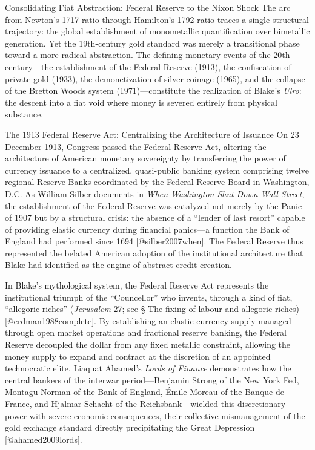 \documentclass[
  ignorenonframetext,
]{beamer}
\author{\texorpdfstring{}{}}
\date{}
\begin{document}
\begin{frame}{Consolidating Fiat Abstraction: Federal Reserve to the
Nixon Shock}
\protect{}\label{consolidating-fiat-abstraction-federal-reserve-to-the-nixon-shock}
The arc from Newton's 1717 ratio through Hamilton's 1792 ratio traces a
single structural trajectory: the global establishment of monometallic
quantification over bimetallic generation. Yet the 19th-century gold
standard was merely a transitional phase toward a more radical
abstraction. The defining monetary events of the 20th century---the
establishment of the Federal Reserve (1913), the confiscation of private
gold (1933), the demonetization of silver coinage (1965), and the
collapse of the Bretton Woods system (1971)---constitute the realization
of Blake's \emph{Ulro}: the descent into a fiat void where money is
severed entirely from physical substance.

\begin{block}{The 1913 Federal Reserve Act: Centralizing the
Architecture of Issuance}
\protect{}\label{the-1913-federal-reserve-act-centralizing-the-architecture-of-issuance}
On 23 December 1913, Congress passed the Federal Reserve Act, altering
the architecture of American monetary sovereignty by transferring the
power of currency issuance to a centralized, quasi-public banking system
comprising twelve regional Reserve Banks coordinated by the Federal
Reserve Board in Washington, D.C. As William Silber documents in
\emph{When Washington Shut Down Wall Street}, the establishment of the
Federal Reserve was catalyzed not merely by the Panic of 1907 but by a
structural crisis: the absence of a ``lender of last resort'' capable of
providing elastic currency during financial panics---a function the Bank
of England had performed since 1694 {[}@silber2007when{]}. The Federal
Reserve thus represented the belated American adoption of the
institutional architecture that Blake had identified as the engine of
abstract credit creation.

In Blake's mythological system, the Federal Reserve Act represents the
institutional triumph of the ``Councellor'' who invents, through a kind
of fiat, ``allegoric riches'' (\emph{Jerusalem} 27; see
\hyperlink{sec-allegoric-riches}{§ The fixing of labour and allegoric
riches}) {[}@erdman1988complete{]}. By establishing an elastic currency
supply managed through open market operations and fractional reserve
banking, the Federal Reserve decoupled the dollar from any fixed
metallic constraint, allowing the money supply to expand and contract at
the discretion of an appointed technocratic elite. Liaquat Ahamed's
\emph{Lords of Finance} demonstrates how the central bankers of the
interwar period---Benjamin Strong of the New York Fed, Montagu Norman of
the Bank of England, Émile Moreau of the Banque de France, and Hjalmar
Schacht of the Reichsbank---wielded this discretionary power with severe
economic consequences, their collective mismanagement of the gold
exchange standard directly precipitating the Great Depression
{[}@ahamed2009lords{]}.


\end{block}
\end{frame}
\end{document}
